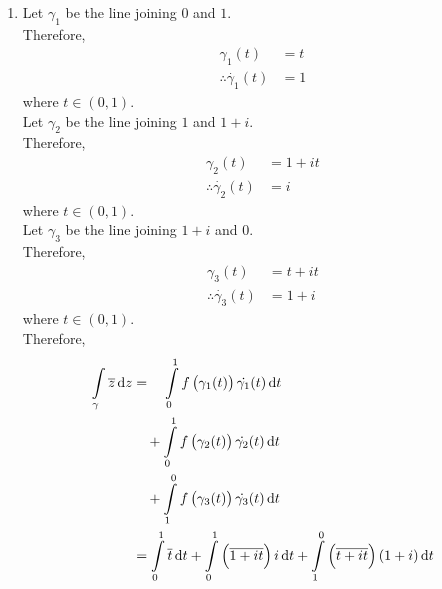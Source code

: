 \documentclass[fleqn, a4paper, 11pt, oneside]{amsart}
\theoremstyle{definition}
\theoremstyle{theorem}
\begin{document}
\begin{solution}
	\begin{enumerate}[leftmargin=*]
		\item
			Let $\gamma_1$ be the line joining $0$ and $1$.\\
			Therefore,
			\begin{align*}
				\gamma_1(t)                  & = t \\
				\therefore \dot{\gamma_1}(t) & = 1
			\end{align*}
			where $t \in (0,1)$.\\
			Let $\gamma_2$ be the line joining $1$ and $1 + i$.\\
			Therefore,
			\begin{align*}
				\gamma_2(t)                  & = 1 + i t \\
				\therefore \dot{\gamma_2}(t) & = i
			\end{align*}
			where $t \in (0,1)$.\\
			Let $\gamma_3$ be the line joining $1 + i$ and $0$.\\
			Therefore,
			\begin{align*}
				\gamma_3(t)                  & = t + i t \\
				\therefore \dot{\gamma_3}(t) & = 1 + i
			\end{align*}
			where $t \in (0,1)$.\\
			Therefore,
			\begin{align*}
				\int\limits_{\gamma} \overline{z} \dif z & = \quad \int\limits_{0}^{1} f\left( \gamma_1(t) \right) \dot{\gamma_1}(t) \dif t                                                                                                  \\
                                                                         & \quad + \int\limits_{0}^{1} f\left( \gamma_2(t) \right) \dot{\gamma_2}(t) \dif t                                                                                                  \\
                                                                         & \quad + \int\limits_{1}^{0} f\left( \gamma_3(t) \right) \dot{\gamma_3}(t) \dif t                                                                                                  \\
                                                                         & = \int\limits_{0}^{1} \overline{t} \dif t + \int\limits_{0}^{1} \left( \overline{1 + i t} \right) i \dif t + \int\limits_{1}^{0} \left( \overline{t + i t} \right) (1 + i) \dif t \\

\end{align*}
\end{enumerate}
\end{solution}
\end{document}

